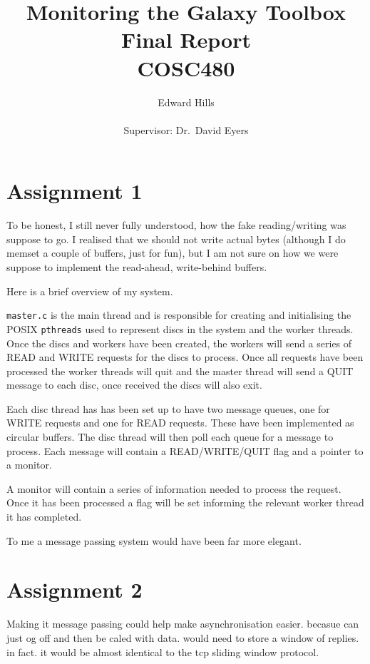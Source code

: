\documentclass[12pt]{article}
\title{Monitoring the Galaxy Toolbox \\ Final Report \\ COSC480}
\author{Edward Hills \\ \\ Supervisor: Dr.\ David Eyers}
\begin{document}
\vspace{-1cm}

\maketitle

\section{Assignment 1}

To be honest, I still never fully understood, how the fake reading/writing was suppose to go. I realised that we should not write actual bytes (although I do memset a couple of buffers, just for fun), but I am not sure on how we were suppose to implement the read-ahead, write-behind buffers.

Here is a brief overview of my system.

\texttt{master.c} is the main thread and is responsible for creating and initialising the POSIX \texttt{pthreads} used to represent discs in the system and the worker threads. Once the discs and workers have been created, the workers will send a series of READ and WRITE requests for the discs to process. Once all requests have been processed the worker threads will quit and the master thread will send a QUIT message to each disc, once received the discs will also exit.

Each disc thread has has been set up to have two message queues, one for WRITE requests and one for READ requests. These have been implemented as circular buffers. The disc thread will then poll each queue for a message to process. Each message will contain a READ/WRITE/QUIT flag and a pointer to a monitor.

A monitor will contain a series of information needed to process the request. Once it has been processed a flag will be set informing the relevant worker thread it has completed. 

To me a message passing system would have been far more elegant.

\section{Assignment 2}

Making it message passing could help make asynchronisation easier. becasue can just og off and then be caled with data. would need to store a window of replies. in fact. it would be almost identical to the tcp sliding window protocol.
\end{document}
